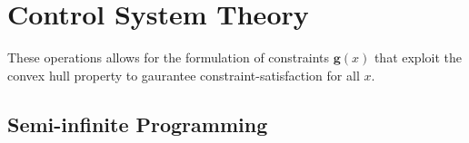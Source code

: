 
\chapter{Control System Theory}\label{chap:control-system-theory}

These operations allows for the formulation of constraints $\mathbf g(x)$ that exploit the convex hull property to gaurantee constraint-satisfaction for all $x$.

\section{Semi-infinite Programming}\label{sec:semi-infinite-programming}